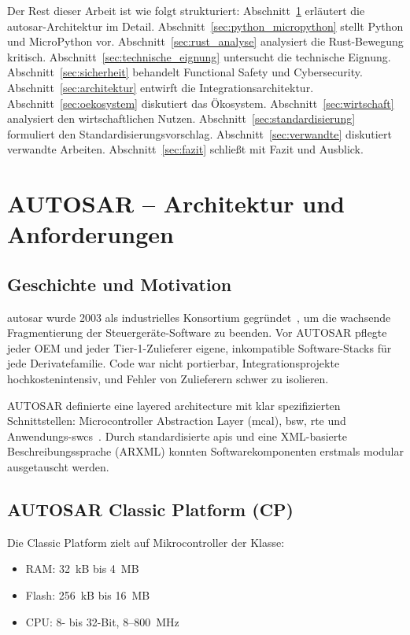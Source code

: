 ﻿\documentclass[12pt,a4paper,twoside]{article}
\begin{document}
Der Rest dieser Arbeit ist wie folgt strukturiert:
Abschnitt~\ref{sec:autosar} erläutert die \gls{autosar}-Architektur im Detail.
Abschnitt~\ref{sec:python_micropython} stellt Python und MicroPython vor.
Abschnitt~\ref{sec:rust_analyse} analysiert die Rust-Bewegung kritisch.
Abschnitt~\ref{sec:technische_eignung} untersucht die technische Eignung.
Abschnitt~\ref{sec:sicherheit} behandelt Functional Safety und Cybersecurity.
Abschnitt~\ref{sec:architektur} entwirft die Integrationsarchitektur.
Abschnitt~\ref{sec:oekosystem} diskutiert das Ökosystem.
Abschnitt~\ref{sec:wirtschaft} analysiert den wirtschaftlichen Nutzen.
Abschnitt~\ref{sec:standardisierung} formuliert den Standardisierungsvorschlag.
Abschnitt~\ref{sec:verwandte} diskutiert verwandte Arbeiten.
Abschnitt~\ref{sec:fazit} schließt mit Fazit und Ausblick.

\section{AUTOSAR -- Architektur und Anforderungen}
\label{sec:autosar}

\subsection{Geschichte und Motivation}
\gls{autosar} wurde 2003 als industrielles Konsortium gegründet~\cite{autosar_overview2017},
um die wachsende Fragmentierung der Steuergeräte-Software zu beenden.
Vor AUTOSAR pflegte jeder OEM und jeder Tier-1-Zulieferer eigene,
inkompatible Software-Stacks für jede Derivatefamilie.
Code war nicht portierbar, Integrationsprojekte hochkostenintensiv,
und Fehler von Zulieferern schwer zu isolieren.

AUTOSAR definierte eine layered architecture mit klar spezifizierten
Schnittstellen: Microcontroller Abstraction Layer (\gls{mcal}),
\gls{bsw}, \gls{rte} und Anwendungs-\glspl{swc}~\cite{autosar_layered2016}.
Durch standardisierte \glspl{api} und eine XML-basierte Beschreibungssprache
(ARXML) konnten Softwarekomponenten erstmals modular ausgetauscht werden.

\subsection{AUTOSAR Classic Platform (CP)}
\label{subsec:cp}

Die Classic Platform zielt auf Mikrocontroller der Klasse:
\begin{itemize}
  \item RAM: 32~kB bis 4~MB
  \item Flash: 256~kB bis 16~MB
  \item CPU: 8- bis 32-Bit, 8--800~MHz
\end{itemize}
\end{document}

